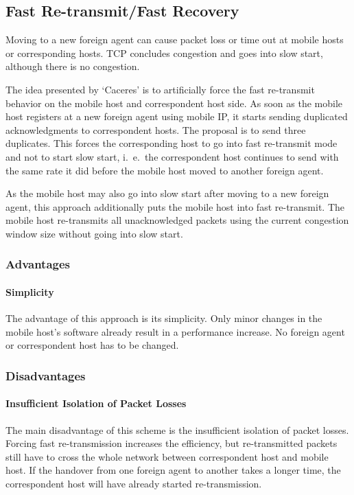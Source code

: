 \subsection{Fast Re-transmit/Fast Recovery}
Moving to a new foreign agent can cause packet loss or time out at mobile hosts or corresponding hosts. TCP concludes congestion and goes into slow start, although there is no congestion. 

The idea presented by `Caceres' is to artificially force the fast re-transmit behavior on the mobile host and correspondent host side. As soon as the mobile host registers at a new foreign agent using mobile IP, it starts sending duplicated
acknowledgments to correspondent hosts. The proposal is to send three duplicates. This forces the corresponding host to go into fast re-transmit mode and not to start slow start, i.\ e.\, the correspondent host continues to send with the same rate it did before the mobile host moved to another foreign agent.

As the mobile host may also go into slow start after moving to a new foreign agent, this approach additionally puts the mobile host into fast re-transmit. The mobile host re-transmits all unacknowledged packets using the current congestion window size without going into slow start.

\subsubsection{Advantages}
\paragraph*{Simplicity}
The {advantage} of this approach is its simplicity. Only minor changes in the mobile host’s software already result in a performance increase. No foreign agent or correspondent host has to be changed.

\subsubsection{Disadvantages}
\paragraph*{Insufficient Isolation of Packet Losses}
The main {disadvantage} of this scheme is the insufficient isolation of packet losses. Forcing fast re-transmission increases the efficiency, but re-transmitted packets still have to cross the whole network between correspondent host and mobile host. If the handover from one foreign agent to another takes a longer time, the correspondent host will have already started re-transmission. %


